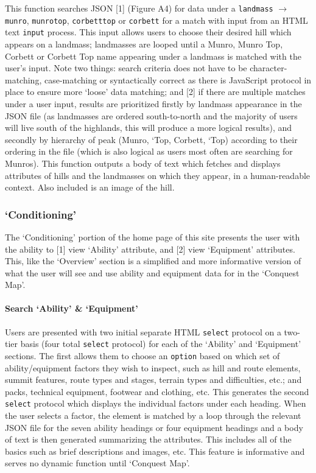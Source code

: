 \documentclass[11pt, english]{article}
\begin{document}
	This function searches JSON [1] (Figure A4) for data under a \texttt{landmass} $\rightarrow$ \texttt{munro}, \texttt{munrotop}, \texttt{corbetttop} or \texttt{corbett} for a match with input from an HTML text \texttt{input} process. This input allows users to choose their desired hill which appears on a landmass; landmasses are looped until a Munro, Munro Top, Corbett or Corbett Top name appearing under a landmass is matched with the user's input. Note two things: search criteria does not have to be character-matching, case-matching or syntactically correct as there is JavaScript protocol in place to ensure more `loose' data matching; and [2] if there are multiple matches under a user input, results are prioritized firstly by landmass appearance in the JSON file (as landmasses are ordered south-to-north and the majority of users will live south of the highlands, this will produce a more logical results), and secondly by hierarchy of peak (Munro, `Top, Corbett, `Top) according to their ordering in the file (which is also logical as users most often are searching for Munros). This function outputs a body of text which fetches and displays attributes of hills and the landmasses on which they appear, in a human-readable context. Also included is an image of the hill.

		\subsubsection{`Conditioning'}

	The `Conditioning' portion of the home page of this site presents the user with the ability to [1] view `Ability' attribute, and [2] view `Equipment' attributes. This, like the `Overview' section is a simplified and more informative version of what the user will see and use ability and equipment data for in the `Conquest Map'.

			\paragraph{Search `Ability' \& `Equipment'}

	Users are presented with two initial separate HTML \texttt{select} protocol on a two-tier basis (four total \texttt{select} protocol) for each of the `Ability' and `Equipment' sections. The first allows them to choose an \texttt{option} based on which set of ability/equipment factors they wish to inspect, such as hill and route elements, summit features, route types and stages, terrain types and difficulties, etc.; and packs, technical equipment, footwear and clothing, etc. This generates the second \texttt{select} protocol which displays the individual factors under each heading. When the user selects a factor, the element is matched by a loop through the relevant JSON file for the seven ability headings or four equipment headings and a body of text is then generated summarizing the attributes. This includes all of the basics such as brief descriptions and images, etc. This feature is informative and serves no dynamic function until `Conquest Map'.
	
\end{document}
